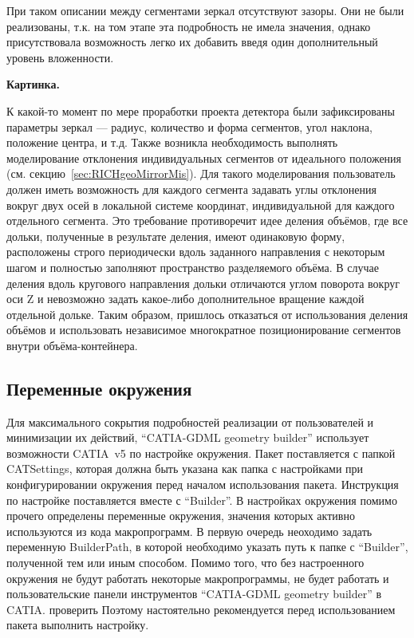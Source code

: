 При таком описании между сегментами зеркал отсутствуют зазоры. Они не были реализованы, т.к. на том этапе эта подробность не имела значения, однако присутствовала возможность легко их добавить введя один дополнительный уровень вложенности.

\textbf{Картинка.}

К какой-то момент по мере проработки проекта детектора были зафиксированы параметры зеркал --- радиус, количество и форма сегментов, угол наклона, положение центра, и т.д. Также возникла необходимость выполнять моделирование отклонения индивидуальных сегментов от идеального положения (см. секцию~\ref{sec:RICHgeoMirrorMis}). Для такого моделирования пользователь должен иметь возможность для каждого сегмента задавать углы отклонения вокруг двух осей в локальной системе координат, индивидуальной для каждого отдельного сегмента. Это требование противоречит идее деления объёмов, где все дольки, полученные в результате деления, имеют одинаковую форму, расположены строго периодически вдоль заданного направления с некоторым шагом и полностью заполняют пространство разделяемого объёма. В случае деления вдоль кругового направления дольки отличаются углом поворота вокруг оси Z и невозможно  задать какое-либо дополнительное вращение каждой отдельной дольке. Таким образом, пришлось отказаться от использования деления объёмов и использовать независимое многократное позиционирование сегментов внутри объёма-контейнера.

\subsection{Переменные окружения}\label{sec:BuilderEnv}

Для максимального сокрытия подробностей реализации от пользователей и минимизации их действий, ``CATIA-GDML geometry builder'' использует возможности CATIA~v5 по настройке окружения. Пакет поставляется с папкой CATSettings, которая должна быть указана как папка с настройками при конфигурировании окружения перед началом использования пакета. Инструкция по настройке поставляется вместе с ``Builder''. В настройках окружения помимо прочего определены переменные окружения, значения которых активно используются из кода макропрограмм. В первую очередь неоходимо задать переменную BuilderPath, в которой необходимо указать путь к папке с ``Builder'', полученной тем или иным способом. Помимо того, что без настроенного окружения не будут работать некоторые макропрограммы, не будет работать и пользовательские панели инструментов ``CATIA-GDML geometry builder'' в CATIA. проверить \todo Поэтому настоятельно рекомендуется перед использованием пакета выполнить настройку.

